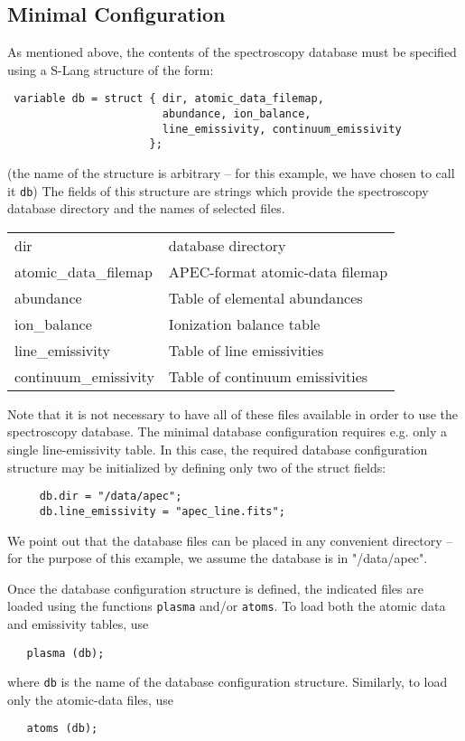 \documentclass{book}
\begin{document}
\subsection{Minimal Configuration}
\label{subsec:min-specdb}

As mentioned above, the contents of the spectroscopy database must be specified
using a S-Lang structure of the form:
\begin{verbatim}
 variable db = struct { dir, atomic_data_filemap,
                        abundance, ion_balance,
                        line_emissivity, continuum_emissivity
                      };
\end{verbatim}
(the name of the structure is arbitrary -- for this example,
we have chosen to call it {\tt db})
The fields of this structure are strings which provide the
spectroscopy database directory and the names of selected files.
\begin{center}
\begin{tabular}{|l|p{2.4in}|}
\hline
dir & database directory \\
atomic\_data\_filemap & APEC-format atomic-data filemap \\
abundance & Table of elemental abundances \\
ion\_balance & Ionization balance table \\
line\_emissivity & Table of line emissivities \\
continuum\_emissivity & Table of continuum emissivities \\
\hline
\end{tabular}
\end{center}

Note that it is not necessary to have all of these files available
in order to use the spectroscopy database. The minimal database
configuration requires e.g. only a single line-emissivity table.
In this case, the required database configuration structure may be initialized by
defining only two of the struct fields:
\begin{verbatim}
     db.dir = "/data/apec";
     db.line_emissivity = "apec_line.fits";
\end{verbatim}
We point out that the database files can be placed in any convenient
directory -- for the purpose of this example, we assume the
database is in "/data/apec".

Once the database configuration structure is defined, the indicated
files are loaded using the functions {\tt plasma} and/or {\tt atoms}.
To load both the atomic data and emissivity tables, use
\begin{verbatim}
   plasma (db);
\end{verbatim}
where {\tt db} is the name of the database configuration structure.
Similarly, to load only the atomic-data files, use
\begin{verbatim}
   atoms (db);
\end{verbatim}
\end{document}
